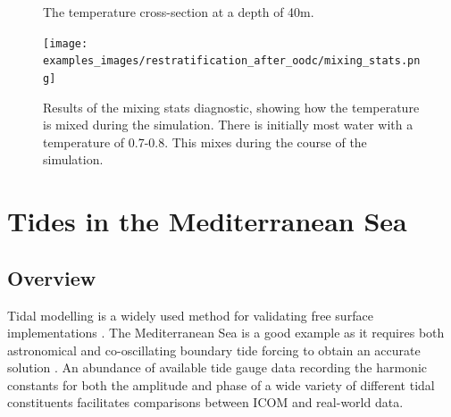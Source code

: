 \begin{figure}[h!]
\begin{center}
\hspace{1cm}

\hspace{1cm}
\caption{The temperature cross-section at a depth of 40m.}
\label{fig:rousset-40m}
\end{center}
\end{figure}


\begin{figure}[h!]
\begin{center}
{\texttt{[image: examples\_images/restratification\_after\_oodc/mixing\_stats.png]}}
\caption{Results of the mixing stats diagnostic, showing how the temperature is mixed during the simulation. There is initially most water with a temperature of 0.7-0.8. This mixes during the course of the simulation.}
\label{fig:rousset-mixing}
\end{center}
\end{figure}





\section{Tides in the Mediterranean Sea}
\label{sec:tides_in_the_med}

\subsection{Overview}

Tidal modelling is a widely used method for validating free surface implementations \citep{Shum1997}. The Mediterranean Sea
is a good example as it requires both astronomical and co-oscillating boundary tide forcing to obtain
an accurate solution \citep{Tsimplis1995, Wells2008}. An abundance of available tide gauge data recording the 
harmonic constants for both the amplitude and phase of a wide variety of different tidal constituents
facilitates comparisons between ICOM and real-world data. 
 


